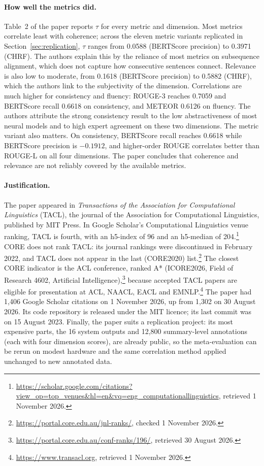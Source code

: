 \documentclass[11pt]{article}
\begin{document}
\paragraph{How well the metrics did.}
Table~2 of the paper reports $\tau$ for every metric and dimension. Most metrics correlate least with coherence; across the eleven metric variants replicated in Section~\ref{sec:replication}, $\tau$ ranges from 0.0588 (BERTScore precision) to 0.3971 (CHRF). The authors explain this by the reliance of most metrics on subsequence alignment, which does not capture how consecutive sentences connect. Relevance is also low to moderate, from 0.1618 (BERTScore precision) to 0.5882 (CHRF), which the authors link to the subjectivity of the dimension. Correlations are much higher for consistency and fluency: ROUGE-3 reaches 0.7059 and BERTScore recall 0.6618 on consistency, and METEOR 0.6126 on fluency. The authors attribute the strong consistency result to the low abstractiveness of most neural models and to high expert agreement on these two dimensions. The metric variant also matters. On consistency, BERTScore recall reaches 0.6618 while BERTScore precision is $-0.1912$, and higher-order ROUGE correlates better than ROUGE-L on all four dimensions. The paper concludes that coherence and relevance are not reliably covered by the available metrics.

\paragraph{Justification.}
The paper appeared in \emph{Transactions of the Association for Computational Linguistics} (TACL), the journal of the Association for Computational Linguistics, published by MIT Press. In Google Scholar's Computational Linguistics venue ranking, TACL is fourth, with an h5-index of 96 and an h5-median of 204.\footnote{\url{https://scholar.google.com/citations?view_op=top_venues&hl=en&vq=eng_computationallinguistics}, retrieved 1 November 2026.} CORE does not rank TACL: its journal rankings were discontinued in February 2022, and TACL does not appear in the last (CORE2020) list.\footnote{\url{https://portal.core.edu.au/jnl-ranks/}, checked 1 November 2026.} The closest CORE indicator is the ACL conference, ranked A* (ICORE2026, Field of Research 4602, Artificial Intelligence),\footnote{\url{https://portal.core.edu.au/conf-ranks/196/}, retrieved 30 August 2026.} because accepted TACL papers are eligible for presentation at ACL, NAACL, EACL and EMNLP.\footnote{\url{https://www.transacl.org}, retrieved 1 November 2026.} The paper had 1,406 Google Scholar citations on 1 November 2026, up from 1,302 on 30 August 2026. Its code repository is released under the MIT licence; its last commit was on 15 August 2023. Finally, the paper suits a replication project: its most expensive parts, the 16 system outputs and 12,800 summary-level annotations (each with four dimension scores), are already public, so the meta-evaluation can be rerun on modest hardware and the same correlation method applied unchanged to new annotated data.
\end{document}
